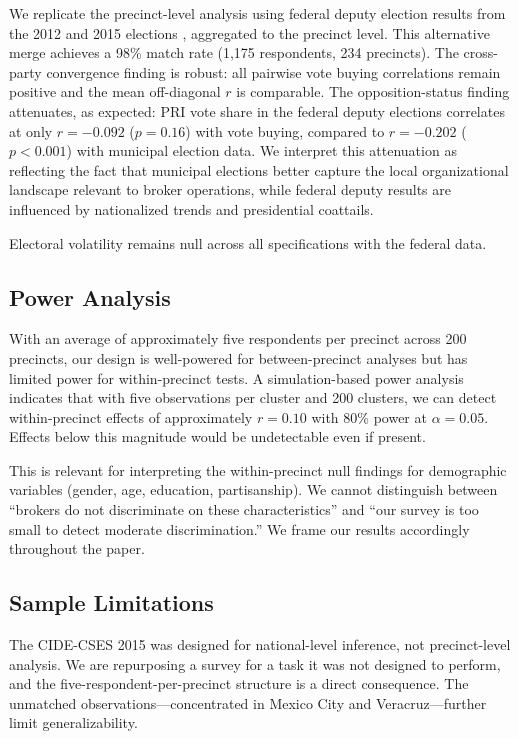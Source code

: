\documentclass[12pt,letterpaper]{article}
\begin{document}
We replicate the precinct-level analysis using federal deputy election results from the 2012 and 2015 elections \citep{magar2018}, aggregated to the precinct level. This alternative merge achieves a 98\% match rate (1,175 respondents, 234 precincts). The cross-party convergence finding is robust: all pairwise vote buying correlations remain positive and the mean off-diagonal $r$ is comparable. The opposition-status finding attenuates, as expected: PRI vote share in the federal deputy elections correlates at only $r = -0.092$ ($p = 0.16$) with vote buying, compared to $r = -0.202$ ($p < 0.001$) with municipal election data. We interpret this attenuation as reflecting the fact that municipal elections better capture the local organizational landscape relevant to broker operations, while federal deputy results are influenced by nationalized trends and presidential coattails.

Electoral volatility remains null across all specifications with the federal data.

\subsection{Power Analysis}

With an average of approximately five respondents per precinct across 200 precincts, our design is well-powered for between-precinct analyses but has limited power for within-precinct tests. A simulation-based power analysis indicates that with five observations per cluster and 200 clusters, we can detect within-precinct effects of approximately $r = 0.10$ with 80\% power at $\alpha = 0.05$. Effects below this magnitude would be undetectable even if present.

This is relevant for interpreting the within-precinct null findings for demographic variables (gender, age, education, partisanship). We cannot distinguish between ``brokers do not discriminate on these characteristics'' and ``our survey is too small to detect moderate discrimination.'' We frame our results accordingly throughout the paper.

\subsection{Sample Limitations}

The CIDE-CSES 2015 was designed for national-level inference, not precinct-level analysis. We are repurposing a survey for a task it was not designed to perform, and the five-respondent-per-precinct structure is a direct consequence. The unmatched observations---concentrated in Mexico City and Veracruz---further limit generalizability.
\end{document}
